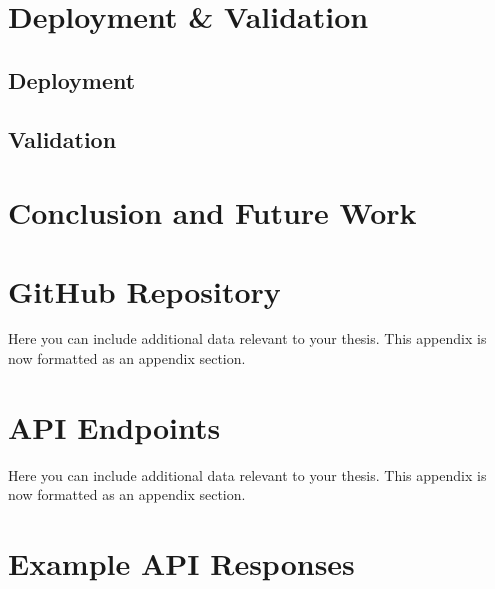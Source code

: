 \documentclass{utitcphd_overleaf}
\begin{document}
\chapter{Deployment \& Validation}
\label{chap:deployment}

\section{Deployment}

\section{Validation}


\chapter{Conclusion and Future Work}
\label{chap:conclusion}

\appendix
\chapter{GitHub Repository}
\label{app:additionaldata}

Here you can include additional data relevant to your thesis. This appendix is now formatted as an appendix section.

\chapter{API Endpoints}
\label{app:additionaldata}

Here you can include additional data relevant to your thesis. This appendix is now formatted as an appendix section.

\chapter{Example API Responses}
\label{app:additionaldata}
\end{document}
